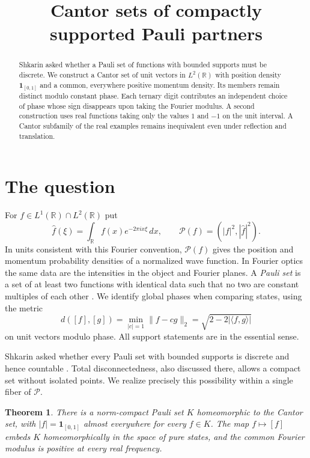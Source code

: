 \documentclass[11pt,reqno]{amsart}
\title{Cantor sets of compactly supported Pauli partners}
\newtheorem{thm}{Theorem}
\newcommand{\R}{\mathbb R}
\newcommand{\one}{\mathbf 1}
\newcommand{\pa}{\mathcal P}
\begin{document}
\begin{abstract}
Shkarin asked whether a Pauli set of functions with bounded supports must be discrete. We construct a Cantor set of unit vectors in \(L^2(\R)\) with position density \(\one_{[0,1]}\) and a common, everywhere positive momentum density. Its members remain distinct modulo constant phase. Each ternary digit contributes an independent choice of phase whose sign disappears upon taking the Fourier modulus. A second construction uses real functions taking only the values \(1\) and \(-1\) on the unit interval. A Cantor subfamily of the real examples remains inequivalent even under reflection and translation.
\end{abstract}
\maketitle

\section{The question}

For \(f\in L^1(\R)\cap L^2(\R)\) put
\[
 \widehat f(\xi)=\int_{\R} f(x)e^{-2\pi i x\xi}\,dx,
 \qquad \pa(f)=(|f|^2,|\widehat f|^2).
\]
In units consistent with this Fourier convention, \(\pa(f)\) gives the position and momentum probability densities of a normalized wave function. In Fourier optics the same data are the intensities in the object and Fourier planes. A \emph{Pauli set} is a set of at least two functions with identical data such that no two are constant multiples of each other \cite{shkarin}. We identify global phases when comparing states, using the metric
\[
 d([f],[g])=\min_{|c|=1}\|f-cg\|_2
             =\sqrt{2-2|\langle f,g\rangle|}
\]
on unit vectors modulo phase. All support statements are in the essential sense.

Shkarin asked whether every Pauli set with bounded supports is discrete and hence countable \cite[Question~5.2 in the preprint]{shkarin}. Total disconnectedness, also discussed there, allows a compact set without isolated points. We realize precisely this possibility within a single fiber of \(\pa\).

\begin{thm}\label{thm:main}
There is a norm-compact Pauli set \(K\) homeomorphic to the Cantor set, with \(|f|=\one_{[0,1]}\) almost everywhere for every \(f\in K\). The map \(f\mapsto[f]\) embeds \(K\) homeomorphically in the space of pure states, and the common Fourier modulus is positive at every real frequency.
\end{thm}
\end{document}
